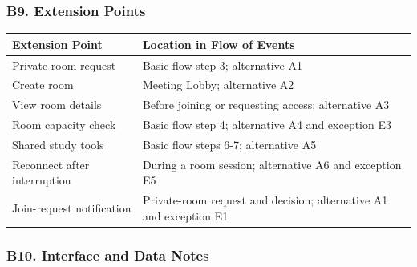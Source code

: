 \documentclass[12pt]{article}
\renewcommand{\baselinestretch}{1.5}
\begin{document}
\hypertarget{sec:b9-extension-points}{}
\subsubsection*{B9. Extension Points}
\par\medskip

\begingroup
\small
\renewcommand{\baselinestretch}{1.0}\selectfont
\renewcommand{\arraystretch}{1.15}
\setlength{\tabcolsep}{6pt}
\begin{longtable}{|>{\raggedright\arraybackslash}p{}|>{\raggedright\arraybackslash}p{}|}
\hline
\textbf{Extension Point} & \textbf{Location in Flow of Events} \\ \hline
\endhead
Private-room request & Basic flow step 3; alternative A1 \\ \hline
Create room & Meeting Lobby; alternative A2 \\ \hline
View room details & Before joining or requesting access; alternative A3 \\ \hline
Room capacity check & Basic flow step 4; alternative A4 and exception E3 \\ \hline
Shared study tools & Basic flow steps 6-7; alternative A5 \\ \hline
Reconnect after interruption & During a room session; alternative A6 and exception E5 \\ \hline
Join-request notification & Private-room request and decision; alternative A1 and exception E1 \\ \hline
\end{longtable}
\endgroup
\par\medskip

\hypertarget{sec:b10-interface-and-data-notes}{}
\subsubsection*{B10. Interface and Data Notes}
\par\medskip
\end{document}
